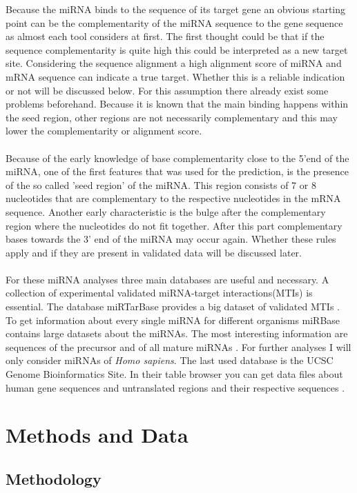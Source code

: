 \documentclass[12pt]{article}
\begin{document}
Because the miRNA binds to the sequence of its target gene an obvious starting point can be the complementarity of the miRNA sequence to the gene sequence as almost each tool considers at first. The first thought could be that if the sequence complementarity is quite high this could be interpreted as a new target site. Considering the sequence alignment a high alignment score of miRNA and mRNA sequence can indicate a true target. Whether this is a reliable indication or not will be discussed below. For this assumption there already exist some problems beforehand. Because it is known that the main binding happens within the seed region, other regions are not necessarily complementary and this may lower the complementarity or alignment score. \\\\
Because of the early knowledge of base complementarity close to the 5'end of the miRNA, one of the first features that was used for the prediction, is the presence of the so called 'seed region' of the miRNA. This region consists of 7 or 8 nucleotides that are complementary to the respective nucleotides in the mRNA sequence. Another early characteristic is the bulge after the complementary region where the nucleotides do not fit together. After this part complementary bases towards the 3' end of the miRNA may occur again. Whether these rules apply and if they are present in validated data will be discussed later. \\\\
For these miRNA analyses three main databases are useful and necessary. A collection of experimental validated miRNA-target interactions(MTIs) is essential. The database miRTarBase provides a big dataset of validated MTIs \cite{Hsu}. To get information about every single miRNA for different organisms miRBase contains large datasets about the miRNAs. The most interesting information are sequences of the precursor and of all mature miRNAs \cite{mirbase}. For further analyses I will only consider miRNAs of \textit{Homo sapiens}. The last used database is the UCSC Genome Bioinformatics Site. In their table browser you can get data files about human gene sequences and untranslated regions and their respective sequences \cite{ucsc}.
  



\section{Methods and Data}


\subsection{Methodology}
\end{document}
